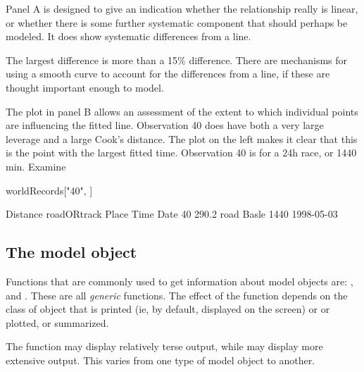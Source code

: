 Panel A is designed
to give an indication whether the relationship really is linear, or
whether there is some further systematic component that should perhaps
be modeled.  It does show systematic differences from a line.

The largest difference is more than a 15\% difference. There are
mechanisms for using a smooth curve to account for the differences
from a line, if these are thought important enough to model.

The plot in panel B allows an assessment of the extent to which individual
points are influencing the fitted line.  Observation 40 does have both
a very large leverage and a large Cook's distance.  The plot on the
left makes it clear that this is the point with the largest fitted
time. Observation 40 is for a 24h race, or 1440 min. Examine
\begin{Schunk}
\begin{Sinput}
worldRecords["40", ]
\end{Sinput}
\begin{Soutput}
   Distance roadORtrack Place Time       Date
40    290.2        road Basle 1440 1998-05-03
\end{Soutput}
\end{Schunk}

\subsection{The model object}\label{ss:modobj}

Functions that are commonly used to get information
about model objects are: ,  and
.  These are all \textit{generic} functions. The effect
of the function depends on the class of object that is printed (ie, by
default, displayed on the screen) or or plotted, or summarized.

The function  may display relatively terse
output, while  may display more extensive output.
This varies from one type of model object to another.

